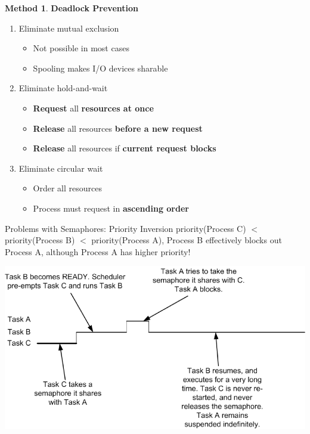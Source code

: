 \documentclass[11pt,a4paper]{article}
\theoremstyle{definition}
\newtheorem{method}{Method}[section]
\newenvironment{myitemize}
{ \begin{itemize}
    \setlength{\itemsep}{5pt}
    \setlength{\parskip}{0pt}
    \setlength{\parsep}{0pt}     }
{ \end{itemize}                  }
\newenvironment{myenumerate}
{ \begin{enumerate}
    \setlength{\itemsep}{5pt}
    \setlength{\parskip}{0pt}
    \setlength{\parsep}{0pt}     }
{ \end{enumerate}                }
\begin{document}
\begin{method}{\textbf{Deadlock Prevention}}
	\begin{myenumerate}
		\item Eliminate mutual exclusion
		\begin{myitemize}
			\item Not possible in most cases
			\item Spooling makes I/O devices sharable
		\end{myitemize}
		\item Eliminate hold-and-wait 
		\begin{myitemize}
			\item \textbf{Request} all \textbf{resources at once}
			\item \textbf{Release} all resources \textbf{before a new request}
			\item \textbf{Release} all resources if \textbf{current request blocks}
		\end{myitemize}
		\item Eliminate circular wait
		\begin{myitemize}
			\item Order all resources
			\item Process must request in \textbf{ascending order}
		\end{myitemize}
	\end{myenumerate}
\end{method}

\begin{tcolorbox}
	\textsf{Problems with Semaphores: Priority Inversion}	priority(Process C) $<$ priority(Process B) $<$ priority(Process A), Process B effectively blocks out Process A, although Process A has higher priority!
	
	\includegraphics[scale=0.5]{m1/priorityInversion}
	\centering
\end{tcolorbox}
\end{document}
